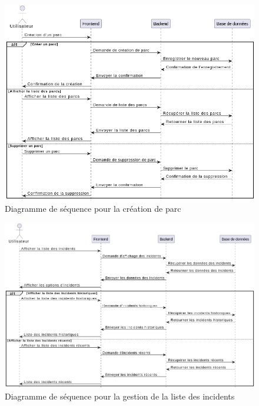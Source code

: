 \begin{figure}[H]
	\centering
	\includegraphics[width=15cm]{./img/composants/diagramme/seq/parc.png}
	\caption{Diagramme de séquence pour la création de parc}
\end{figure}
\begin{figure}[H]
	\centering
	\includegraphics[width=15cm]{./img/composants/diagramme/seq/3seqyIncidentdrawio.png}
	\caption{Diagramme de séquence pour la gestion de la liste des incidents}
\end{figure}

